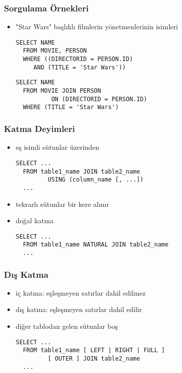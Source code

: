 \documentclass[dvipsnames]{beamer}
\theoremstyle{plain}
\begin{document}
\begin{frame}[fragile]
  \frametitle{Sorgulama Örnekleri}

  \begin{itemize}
  \item "Star Wars" başlıklı filmlerin yönetmenlerinin isimleri
   \begin{lstlisting}
SELECT NAME
  FROM MOVIE, PERSON
  WHERE ((DIRECTORID = PERSON.ID)
     AND (TITLE = 'Star Wars'))
    \end{lstlisting}

    \pause
    \begin{lstlisting}
SELECT NAME
  FROM MOVIE JOIN PERSON
          ON (DIRECTORID = PERSON.ID)
  WHERE (TITLE = 'Star Wars')
    \end{lstlisting}
  \end{itemize}
\end{frame}

\begin{frame}[fragile]
  \frametitle{Katma Deyimleri}

  \begin{itemize}
    \item eş isimli sütunlar üzerinden
    \begin{lstlisting}
SELECT ...
  FROM table1_name JOIN table2_name
         USING (column_name [, ...])
  ...
    \end{lstlisting}
    \item tekrarlı sütunlar bir kere alınır
    
    \pause
    \medskip
    \item doğal katma
    \begin{lstlisting}
SELECT ...
  FROM table1_name NATURAL JOIN table2_name
  ...
    \end{lstlisting}
  \end{itemize}
\end{frame}

\begin{frame}[fragile]
  \frametitle{Dış Katma}

  \begin{itemize}
    \item iç katma: eşleşmeyen satırlar dahil edilmez
    
    \medskip
    \item \alert{dış katma}: eşleşmeyen satırlar dahil edilir
    \item diğer tablodan gelen sütunlar boş
    \begin{lstlisting}
SELECT ...
  FROM table1_name [ LEFT | RIGHT | FULL ]
         [ OUTER ] JOIN table2_name
  ...
    \end{lstlisting}
  \end{itemize}
\end{frame}
\end{document}
